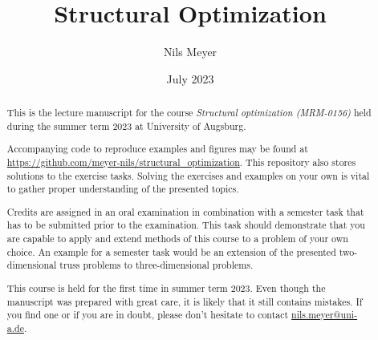\documentclass[a4paper]{report}
\title{Structural Optimization}
\author{Nils Meyer}
\date{July 2023}
\begin{document}
\maketitle

\begin{abstract}
    This is the lecture manuscript for the course \emph{Structural optimization (MRM-0156)} held during the summer term 2023 at University of Augsburg. 

    Accompanying code to reproduce examples and figures may be found at \url{https://github.com/meyer-nils/structural_optimization}. This repository also stores solutions to the exercise tasks. Solving the exercises and examples on your own is vital to gather proper understanding of the presented topics. 

    Credits are assigned in an oral examination in combination with a semester task that has to be submitted prior to the examination. This task should demonstrate that you are capable to apply and extend methods of this course to a problem of your own choice. An example for a semester task would be an extension of the presented two-dimensional truss problems to three-dimensional problems. 

    This course is held for the first time in summer term 2023. Even though the manuscript was prepared with great care, it is likely that it still contains mistakes. If you find one or if you are in doubt, please don't hesitate to contact \href{mailto:nils.meyer@uni-a.de}{nils.meyer@uni-a.de}. 
\end{abstract}

\setcounter{tocdepth}{1}
\tableofcontents









\end{document}
